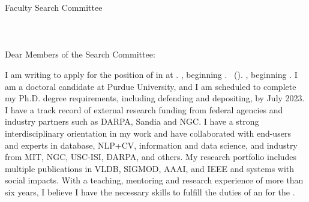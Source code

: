 \documentclass[10pt]{article}
\begin{document}
\thispagestyle{plain}

\pagestyle{empty}

Faculty Search Committee \\
\DepartmentName \\
\InstitutionName \\
\DepartmentAddress\\

Dear Members of the Search Committee:

I am writing to apply for the position of \PositionName{} 
\ifx\DepartmentName\undefined
\else
in 
\DepartmentName{} 
\fi
at \InstitutionName{}%
\ifx\shortInstitutionName\undefined
    \ifx\startDate\undefined
        .
    \else
        , beginning \startDate{}. %
    \fi
\else
    ~(\shortInstitutionName).   \ifx\startDate\undefined
    \else
        , beginning \startDate{}. %
    \fi
\fi
I am a doctoral candidate at Purdue University, and I am scheduled to complete my Ph.D. degree requirements, including defending and depositing, by July 2023. I have a track record of external research funding from federal agencies and industry partners such as DARPA, Sandia and NGC. I have a strong interdisciplinary orientation in my work and have collaborated with end-users and experts in database, NLP+CV, information and data science, and industry from MIT, NGC, USC-ISI, DARPA, and others. My research portfolio includes multiple publications in VLDB, SIGMOD, AAAI, and IEEE and systems with social impacts.
With a teaching, mentoring and research experience of more than six years, I believe I have the necessary skills to fulfill the duties of an \PositionName{} for the \InstitutionName{}.
%
\end{document}
